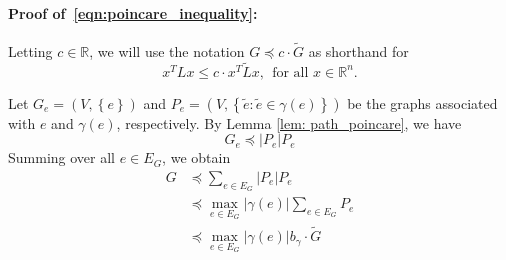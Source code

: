 \documentclass{article}
\newcommand{\Reals}{\mathbb{R}}
\newcommand{\abs}[1]{\left \lvert #1 \right \rvert}
\newcommand{\set}[1]{\left\{#1\right\}}
\newcommand{\1}{\mathbf{1}}
\newcommand{\wt}[1]{\widetilde{#1}}
\theoremstyle{alden}
\theoremstyle{aldenthm}
\theoremstyle{definition}
\theoremstyle{remark}
\begin{document}
\paragraph{Proof of~\eqref{eqn:poincare_inequality}:}

Letting $c \in \Reals$, we will use the notation $G \preceq c \cdot  \wt{G}$ as shorthand for
\begin{equation*}
x^T L x \leq c \cdot  x^T \wt{L} x,~~\textrm{for all $x \in \Reals^n$}.
\end{equation*}


Let $G_e = (V, \set{e})$ and $P_e = (V, \set{\widetilde{e}: \widetilde{e} \in \gamma(e)})$ be the graphs associated with $e$ and $\gamma(e)$, respectively. By Lemma \ref{lem: path_poincare}, we have
\begin{equation*}
G_{e} \preceq \abs{P_e} P_e
\end{equation*}
Summing over all $e \in E_G$, we obtain
\begin{align*}
G & \preceq \sum_{e \in E_G} \abs{P_e} P_e \\
& \preceq \max_{e \in E_G} \abs{\gamma(e)} \sum_{e \in E_G} P_e \\
& \preceq \max_{e \in E_G} \abs{\gamma(e)} b_{\gamma}\cdot \widetilde{G}
\end{align*}
\end{document}
